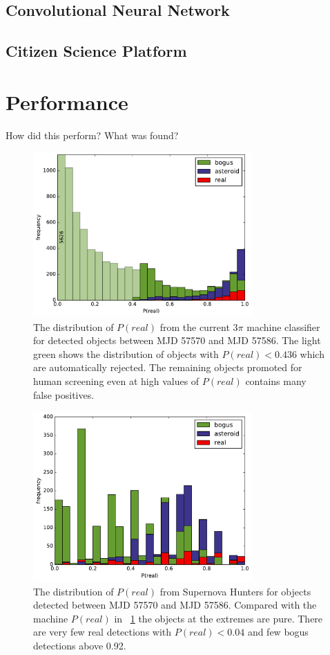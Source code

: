\documentclass[a4paper,fleqn,usenatbib]{mnras}
\begin{document}
\subsection{Convolutional Neural Network}
\subsection{Citizen Science Platform}

\section{Performance}

How did this perform? What was found?

\begin{figure}
   \includegraphics[width=84mm]{figs/machine_hist.pdf}
   \caption{The distribution of $P(real)$ from the current 3$\pi$ machine classifier 
            for detected objects between MJD 57570 and MJD 57586.  The light green shows the distribution of 
            objects with $P(real) < 0.436$ which are automatically rejected.  The remaining 
            objects promoted for human screening even at high values of $P(real)$ contains
            many false positives.} 
   \label{fig:machine_dist} 
\end{figure}


\begin{figure}
   \includegraphics[width=84mm]{figs/human_hist.pdf}
   \caption{The distribution of $P(real)$ from Supernova Hunters for objects detected between 
            MJD 57570 and MJD 57586.  Compared with the machine $P(real)$ in ~\ref{fig:machine_dist}
            the objects at the extremes are pure.  There are very few real detections with 
            $P(real) < 0.04$ and few bogus detections above 0.92.} 
   \label{fig:human_dist} 
\end{figure}
\end{document}
